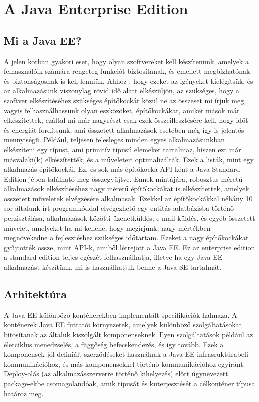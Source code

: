\documentclass[centeredchapter]{thesis-ekf}
\theoremstyle{definition}
\theoremstyle{remark}
\begin{document}
\chapter{A Java Enterprise Edition}

\section{Mi a Java EE?}

A jelen korban gyakori eset, hogy olyan szoftvereket kell készítenünk, amelyek a felhasználóik számára rengeteg funkciót biztosítanak, és emellett megbízhatónak és biztonságosnak is kell lenniük. Ahhoz , hogy ezeket az igényeket kielégítsük, és az alkalmazásunk viszonylag rövid idő alatt elkészüljön, az szükséges, hogy a szoftver elkészítéséhez szükséges építőkockát közül ne az összeset mi írjuk meg, vagyis felhasználhassunk olyan eszközöket, építőkockákat, amiket mások már elkészítettek, ezáltal mi már nagyrészt csak ezek összeillesztésére kell, hogy időt és energiát fordítsunk, ami összetett alkalmazások esetében még így is jelentős mennyiségű. 
Például, teljesen felesleges minden egyes alkalmazásunkban elkészíteni egy típust, ami primitív típusú elemeket tartalmaz, hiszen ezt már másvalaki(k) elkészítették, és a műveleteit optimalizálták. Ezek a listák, mint egy alkalmazás építőkockái. Ez, és sok más építőkocka API-ként a Java Standard Edition-jében található meg összegyűjtve.
Ennek mintájára, robosztus méretű alkalmazások elkészítéséhez nagy méretű építőkockákat is elkészítettek, amelyek összetett műveletek elvégzésére alkalmasak. Ezekkel az építőkockákkal néhány 10 sor általunk írt programkóddal elvégezhető egy entitás adatbázisba történő perzisztálása, alkalmazások közötti üzenetküldés, e-mail küldés, és egyéb összetett művelet, amelyeket ha mi kellene, hogy megírjunk, nagy mértékben megnövekedne a fejlesztéshez szükséges időtartam.
Ezeket a nagy építőkockákat gyűjtötték össze, mint API-k, amiből létrejött a Java EE.
Ez az enterprise edition a standard edition teljes egészét felhasználhatja, illetve ha egy Java EE alkalmazást készítünk, mi is használhatjuk benne a Java SE tartalmát.

\section{Arhitektúra}

A Java EE különböző konténerekben implementált specifikációk halmaza. A konténerek Java EE futtatói környezetek, amelyek különböző szolgáltatásokat bitosítanak az általuk kiszolgált komponenseknek. Ilyen szolgáltatások például az életciklus menedzselés, a függőség befecskendezés, és így tovább. Ezek a komponensek jól definiált szerződéseket használnak a Java EE infrasruktúrabeli kommunikációhoz, és más komponensekkel történő kommunikációhoz egyíránt. Deploy-olás (az alkalmazásszerverre történő kihelyezés) előtt úgynevezett package-ekbe csomagolandóak, amik típusát és kuterjesztését a célkonténer típusa határoz meg.
\end{document}
